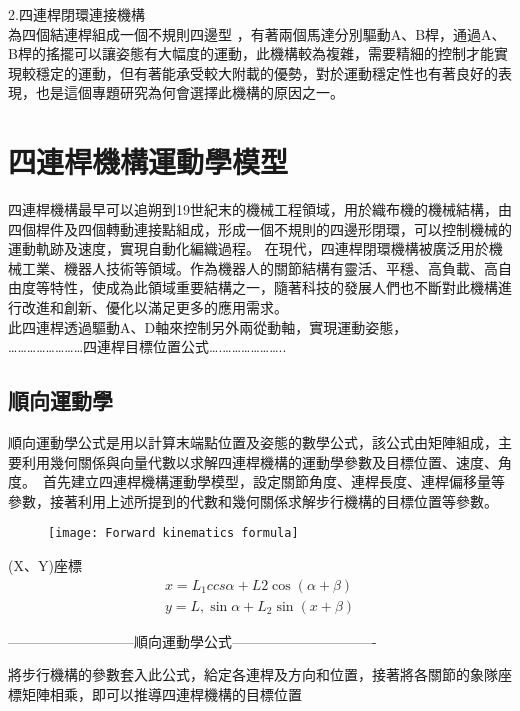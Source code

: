 2.四連桿閉環連接機構\\
為四個結連桿組成一個不規則四邊型 ，有著兩個馬達分別驅動A、B桿，通過A、B桿的搖擺可以讓姿態有大幅度的運動，此機構較為複雜，需要精細的控制才能實現較穩定的運動，但有著能承受較大附載的優勢，對於運動穩定性也有著良好的表現，也是這個專題研究為何會選擇此機構的原因之一。\\

\section{四連桿機構運動學模型}

四連桿機構最早可以追朔到19世紀末的機械工程領域，用於織布機的機械結構，由四個桿件及四個轉動連接點組成，形成一個不規則的四邊形閉環，可以控制機械的運動軌跡及速度，實現自動化編織過程。
在現代，四連桿閉環機構被廣泛用於機械工業、機器人技術等領域。作為機器人的關節結構有靈活、平穩、高負載、高自由度等特性，使成為此領域重要結構之一，隨著科技的發展人們也不斷對此機構進行改進和創新、優化以滿足更多的應用需求。\\
 此四連桿透過驅動A、D軸來控制另外兩從動軸，實現運動姿態，\\

……………………四連桿目標位置公式….………………..

\subsection{順向運動學}
順向運動學公式是用以計算末端點位置及姿態的數學公式，該公式由矩陣組成，主要利用幾何關係與向量代數以求解四連桿機構的運動學參數及目標位置、速度、角度。\
首先建立四連桿機構運動學模型，設定關節角度、連桿長度、連桿偏移量等參數，接著利用上述所提到的代數和幾何關係求解步行機構的目標位置等參數。\\

 \begin{figure}
        \texttt{[image: Forward kinematics formula]} %
    \end{figure}
    
 (X、Y)座標
 \[
 \begin{aligned}
 x=L_{1}ccs\alpha +L2\cos \left( \alpha +\beta \right) \\ y=L,\sin \alpha +L_{2}\sin \left( x+\beta \right) 
 \end{aligned}
 \]
 
---------------------------順向運動學公式-------------------------------


將步行機構的參數套入此公式，給定各連桿及方向和位置，接著將各關節的象隊座標矩陣相乘，即可以推導四連桿機構的目標位置\\

